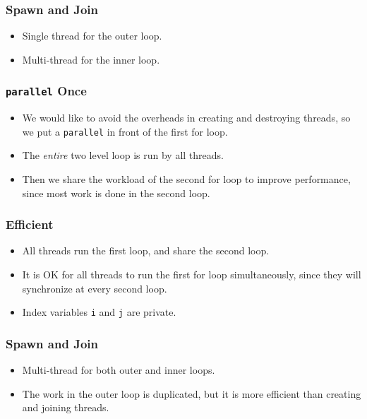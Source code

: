 \documentclass{beamer}
\begin{document}
\begin{frame}
\frametitle{Spawn and Join}
\centerline{}
\begin{itemize}
\item Single thread for the outer loop.
\item Multi-thread for the inner loop.
\end{itemize}
\end{frame}

\begin{frame}
\frametitle{{\tt parallel} Once}
\begin{itemize}
\item We would like to avoid the overheads in creating and destroying
  threads, so we put a {\tt parallel} in front of the first for loop.
\item The {\em entire} two level loop is run by all threads.
\item Then we share the workload of the second for loop to improve
  performance,  since  most work is done in the second loop.
\end{itemize}
\end{frame}

\begin{frame}
\end{frame}

\begin{frame}
\frametitle{Efficient}
\begin{itemize}
\item All threads run the first loop, and share the second loop.
\item It is OK for all threads to run the first for loop
  simultaneously, since they will synchronize at every second loop.
\item Index variables {\tt i} and {\tt j} are private.
\end{itemize}
\end{frame}

\begin{frame}
\frametitle{Spawn and Join}
\centerline{}
\begin{itemize}
\item Multi-thread for both outer and inner loops.
\item The work in the outer loop is duplicated, but it is more
  efficient than creating and joining threads.
\end{itemize}
\end{frame}
\end{document}
